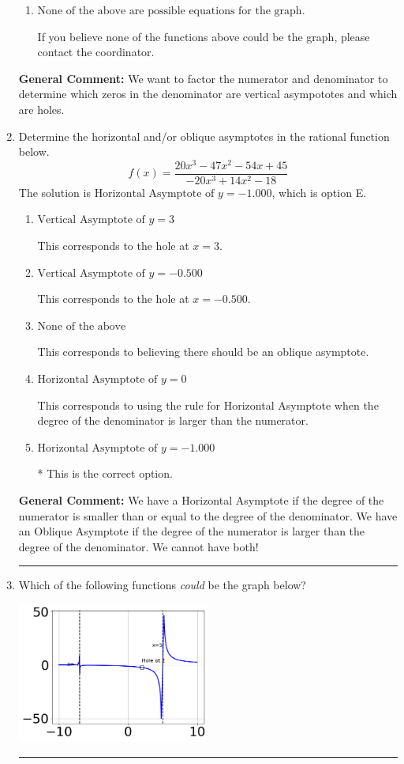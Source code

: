 \documentclass{extbook}[14pt]
\newcommand{\litem}[1]{\item #1

\rule{\textwidth}{0.4pt}}
\begin{document}
\begin{enumerate}
{\begin{enumerate}[label=\Alph*.]
Remember that factors are written as $x-z$. For example, the zero $x=-6$ corresponds to the factor $x-(-6)$.
\item \( \text{None of the above are possible equations for the graph.} \)

If you believe none of the functions above could be the graph, please contact the coordinator.
\end{enumerate}

\textbf{General Comment:} We want to factor the numerator and denominator to determine which zeros in the denominator are vertical asympototes and which are holes.
}
\litem{
Determine the horizontal and/or oblique asymptotes in the rational function below.
\[ f(x) = \frac{20x^{3} -47 x^{2} -54 x + 45}{-20x^{3} +14 x^{2} -18} \]The solution is \( \text{Horizontal Asymptote of } y = -1.000  \), which is option E.\begin{enumerate}[label=\Alph*.]
\item \( \text{Vertical Asymptote of } y = 3  \)

This corresponds to the hole at $x = 3$.
\item \( \text{Vertical Asymptote of } y = -0.500  \)

This corresponds to the hole at $x = -0.500$.
\item \( \text{None of the above} \)

This corresponds to believing there should be an oblique asymptote.
\item \( \text{Horizontal Asymptote of } y = 0  \)

This corresponds to using the rule for Horizontal Asymptote when the degree of the denominator is larger than the numerator.
\item \( \text{Horizontal Asymptote of } y = -1.000  \)

* This is the correct option.
\end{enumerate}

\textbf{General Comment:} We have a Horizontal Asymptote if the degree of the numerator is smaller than or equal to the degree of the denominator. We have an Oblique Asymptote if the degree of the numerator is larger than the degree of the denominator. We cannot have both!
}
\litem{
Which of the following functions \textit{could} be the graph below?

\begin{center}
    \includegraphics[width=0.5\textwidth]{../Figures/identifyGraphOfRationalFunctionC.png}
\end{center}


}
\end{enumerate}
\end{document}
